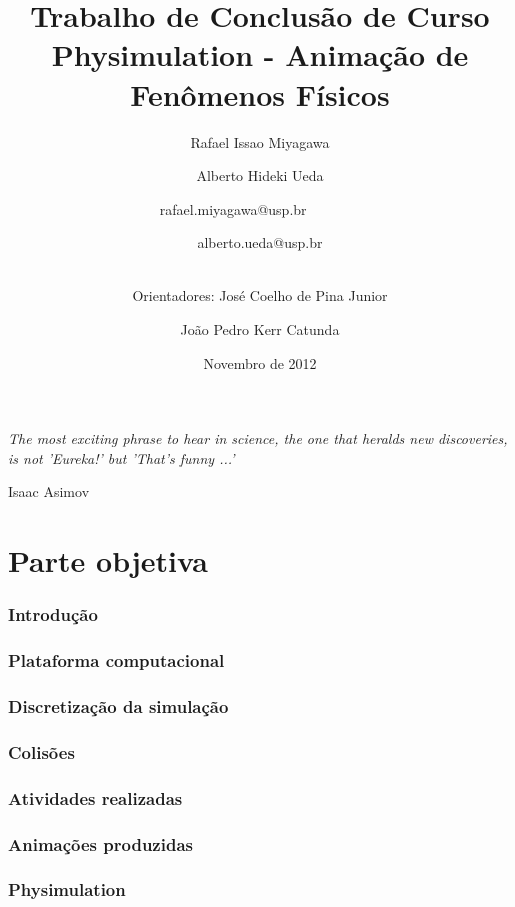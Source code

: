 \documentclass[a4paper,12pt,titlepage]{article}
\title{Trabalho de Conclusão de Curso \\
Physimulation - Animação de Fenômenos Físicos}
\author{Rafael Issao Miyagawa \and Alberto Hideki Ueda \and
	{\small rafael.miyagawa@usp.br \ \ \ \ \ \ \ } \and {\small alberto.ueda@usp.br} \\ \ \and    
	Orientadores: José Coelho de Pina Junior \and  João Pedro Kerr Catunda }
\date{Novembro de 2012}
\begin{document}
\maketitle

\vspace*{\fill}
\epigraph{\it The most exciting phrase to hear in science, the one that heralds new discoveries, is not 'Eureka!' but 'That's funny ...'}{Isaac Asimov}
\newpage

\tableofcontents
\pagebreak

\part{Parte objetiva}
\section{Introdução} \label{introducao}

\newpage

\section{Plataforma computacional} \label{plataforma}

\newpage

\section{Discretização da simulação} \label{discretizacao}

\newpage

\section{Colisões} \label{colisoes}

\newpage

\section{Atividades realizadas} \label{atividades}

\newpage

\section{Animações produzidas} \label{animacoes}

\newpage

\section{Physimulation} \label{physimulation}

\newpage
\end{document}

